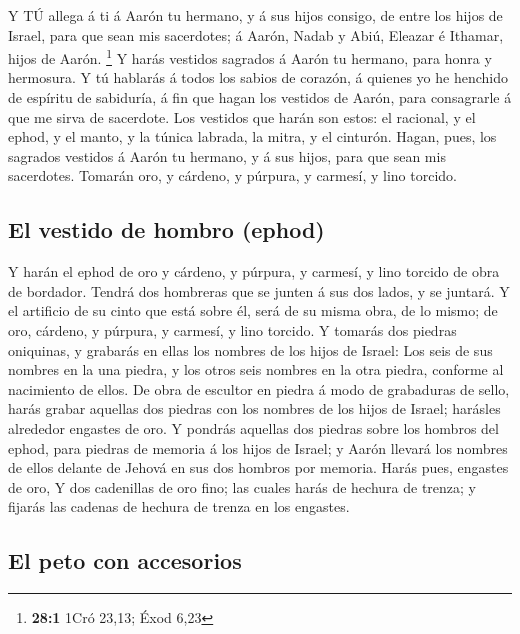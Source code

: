  Y TÚ allega á ti á Aarón tu hermano, y á sus hijos consigo,
de entre los hijos de Israel, para que sean mis sacerdotes; á Aarón,
Nadab y Abiú, Eleazar é Ithamar, hijos de Aarón. \footnote{\textbf{28:1}
  1Cró 23,13; Éxod 6,23}  Y harás vestidos sagrados á Aarón
tu hermano, para honra y hermosura.  Y tú hablarás á todos
los sabios de corazón, á quienes yo he henchido de espíritu de
sabiduría, á fin que hagan los vestidos de Aarón, para consagrarle á que
me sirva de sacerdote.  Los vestidos que harán son estos: el
racional, y el ephod, y el manto, y la túnica labrada, la mitra, y el
cinturón. Hagan, pues, los sagrados vestidos á Aarón tu hermano, y á sus
hijos, para que sean mis sacerdotes.  Tomarán oro, y
cárdeno, y púrpura, y carmesí, y lino torcido.

\hypertarget{el-vestido-de-hombro-ephod}{%
\subsection{El vestido de hombro
(ephod)}\label{el-vestido-de-hombro-ephod}}

 Y harán el ephod de oro y cárdeno, y púrpura, y carmesí, y
lino torcido de obra de bordador.  Tendrá dos hombreras que
se junten á sus dos lados, y se juntará.  Y el artificio de
su cinto que está sobre él, será de su misma obra, de lo mismo; de oro,
cárdeno, y púrpura, y carmesí, y lino torcido.  Y tomarás
dos piedras oniquinas, y grabarás en ellas los nombres de los hijos de
Israel:  Los seis de sus nombres en la una piedra, y los
otros seis nombres en la otra piedra, conforme al nacimiento de ellos.
 De obra de escultor en piedra á modo de grabaduras de
sello, harás grabar aquellas dos piedras con los nombres de los hijos de
Israel; harásles alrededor engastes de oro.  Y pondrás
aquellas dos piedras sobre los hombros del ephod, para piedras de
memoria á los hijos de Israel; y Aarón llevará los nombres de ellos
delante de Jehová en sus dos hombros por memoria.  Harás
pues, engastes de oro,  Y dos cadenillas de oro fino; las
cuales harás de hechura de trenza; y fijarás las cadenas de hechura de
trenza en los engastes.

\hypertarget{el-peto-con-accesorios}{%
\subsection{El peto con accesorios}\label{el-peto-con-accesorios}}

